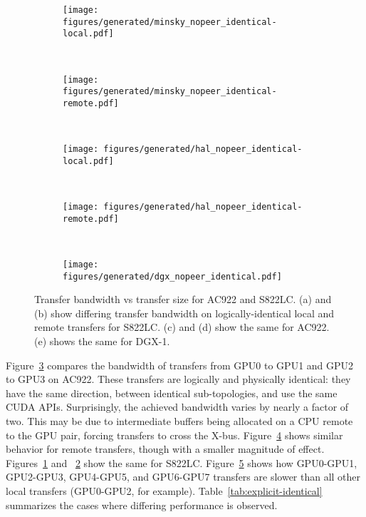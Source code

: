 \begin{figure}[ht]
	\centering
	\begin{subfigure}[b]{0.4\textwidth}
		\texttt{[image: figures/generated/minsky\_nopeer\_identical-local.pdf]}
		\caption{}
		\label{fig:explicit-nopeer-identical-s822lc-local}
	\end{subfigure}
	~
	\begin{subfigure}[b]{0.4\textwidth}
		\texttt{[image: figures/generated/minsky\_nopeer\_identical-remote.pdf]}
		\caption{}
		\label{fig:explicit-nopeer-identical-s822lc-remote}
	\end{subfigure}
    \\
    \begin{subfigure}[b]{0.4\textwidth}
        \texttt{[image: figures/generated/hal\_nopeer\_identical-local.pdf]}
        \caption{}
        \label{fig:explicit-nopeer-identical-ac922-local}
    \end{subfigure}
    ~
    \begin{subfigure}[b]{0.4\textwidth}
        \texttt{[image: figures/generated/hal\_nopeer\_identical-remote.pdf]}
        \caption{}
        \label{fig:explicit-nopeer-identical-ac922-remote}
    \end{subfigure}
	\\
	\begin{subfigure}[b]{0.4\textwidth}
		\texttt{[image: figures/generated/dgx\_nopeer\_identical.pdf]}
		\caption{}
		\label{fig:explicit-nopeer-identical-dgx}
	\end{subfigure}
	\caption[GPU-GPU \texttt{cudaMemcpy} Bandwidth on Identical Links]{
		Transfer bandwidth vs transfer size for AC922 and S822LC.
		(a) and (b) show differing transfer bandwidth on logically-identical local and remote transfers for S822LC.
		(c) and (d) show the same for AC922.
		(e) shows the same for DGX-1.
	}
	\label{fig:explicit-nopeer-identical}
\end{figure}

Figure~\ref{fig:explicit-nopeer-identical-ac922-local} compares the bandwidth of transfers from GPU0 to GPU1 and GPU2 to GPU3 on AC922.
These transfers are logically and physically identical: they have the same direction, between identical sub-topologies, and use the same CUDA APIs.
Surprisingly, the achieved bandwidth varies by nearly a factor of two.
This may be due to intermediate buffers being allocated on a CPU remote to the GPU pair, forcing transfers to cross the X-bus.
Figure~\ref{fig:explicit-nopeer-identical-ac922-remote} shows similar behavior for remote transfers, though with a smaller magnitude of effect.
Figures~\ref{fig:explicit-nopeer-identical-s822lc-local} and ~\ref{fig:explicit-nopeer-identical-s822lc-remote} show the same for S822LC.
Figure~\ref{fig:explicit-nopeer-identical-dgx} shows how GPU0-GPU1, GPU2-GPU3, GPU4-GPU5, and GPU6-GPU7 transfers are slower than all other local transfers (GPU0-GPU2, for example).
Table~\ref{tab:explicit-identical} summarizes the cases where differing performance is observed.


